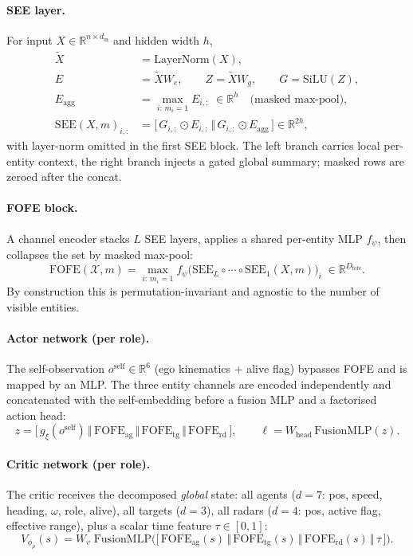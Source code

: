 \documentclass[11pt,a4paper]{article}
\begin{document}
\paragraph{SEE layer.}
For input $X\in\mathbb{R}^{n\times d_{\text{in}}}$ and hidden width $h$,
\begin{align}
\tilde X &= \mathrm{LayerNorm}(X),\\
E &= \tilde X W_e,\qquad Z=\tilde X W_g,\qquad G=\mathrm{SiLU}(Z),\\
E_{\text{agg}} &= \max_{i:\,m_i=1} E_{i,:} \;\in\mathbb R^{h} \quad\text{(masked max-pool),}\\
\mathrm{SEE}(X,m)_{i,:} &= \big[\,G_{i,:}\odot E_{i,:}\,\big\Vert\,G_{i,:}\odot E_{\text{agg}}\,\big]\in\mathbb R^{2h},
\end{align}
with layer-norm omitted in the first SEE block. The left branch carries
local per-entity context, the right branch injects a gated global summary;
masked rows are zeroed after the concat.

\paragraph{FOFE block.}
A channel encoder stacks $L$ SEE layers, applies a shared per-entity MLP
$f_\psi$, then collapses the set by masked max-pool:
\begin{equation}
\mathrm{FOFE}(\mathcal X,m)
= \max_{i:\,m_i=1} f_\psi\!\big(\mathrm{SEE}_L\circ\cdots\circ\mathrm{SEE}_1(X,m)\big)_i
\;\in\mathbb R^{D_\mathrm{fofe}}.
\end{equation}
By construction this is permutation-invariant and agnostic to the number of
visible entities.

\paragraph{Actor network (per role).}
The self-observation $o^{\text{self}}\in\mathbb R^{6}$ (ego kinematics + alive
flag) bypasses FOFE and is mapped by an MLP. The three entity channels are
encoded independently and concatenated with the self-embedding before a
fusion MLP and a factorised action head:
\begin{equation}
z = \big[\,g_\xi(o^{\text{self}})\,\big\Vert\,\mathrm{FOFE}_\text{ag}\,\big\Vert\,
        \mathrm{FOFE}_\text{tg}\,\big\Vert\,\mathrm{FOFE}_\text{rd}\,\big],\qquad
\bm\ell = W_{\text{head}}\,\mathrm{FusionMLP}(z).
\end{equation}

\paragraph{Critic network (per role).}
The critic receives the decomposed \emph{global} state: all agents
($d{=}7$: pos, speed, heading, $\omega$, role, alive), all targets ($d{=}3$),
all radars ($d{=}4$: pos, active flag, effective range), plus a scalar
time feature $\tau\in[0,1]$:
\begin{equation}
V_{\phi_\rho}(s) = W_v\;\mathrm{FusionMLP}\!\Big(
\big[\,\mathrm{FOFE}_\text{ag}(s)\,\big\Vert\,\mathrm{FOFE}_\text{tg}(s)\,\big\Vert\,
      \mathrm{FOFE}_\text{rd}(s)\,\big\Vert\,\tau\,\big]\Big).
\end{equation}
\end{document}
